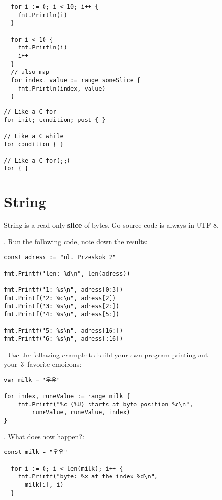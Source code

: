 \documentclass[11pt, letterpaper]{article}
\begin{document}
\begin{verbatim}
  for i := 0; i < 10; i++ {
    fmt.Println(i)
  }

  for i < 10 {
    fmt.Println(i)
    i++
  }
  // also map
  for index, value := range someSlice {
    fmt.Println(index, value)
  }
\end{verbatim}

\begin{verbatim}
// Like a C for
for init; condition; post { }

// Like a C while
for condition { }

// Like a C for(;;)
for { }
\end{verbatim}

\section{String}

String is a read-only \textbf{slice} of bytes. Go source code is always in {\small UTF}-8.

. Run the following code, note down the results:

\begin{verbatim}
const adress := "ul. Przeskok 2"

fmt.Printf("len: %d\n", len(adress))

fmt.Printf("1: %s\n", adress[0:3])
fmt.Printf("2: %c\n", adress[2])
fmt.Printf("3: %s\n", adress[2:])
fmt.Printf("4: %s\n", adress[5:])

fmt.Printf("5: %s\n", adress[16:])
fmt.Printf("6: %s\n", adress[:16])
\end{verbatim}


. Use the following example to build your own program printing out your~3~favorite emoicons:

\begin{verbatim}
var milk = "우유"

for index, runeValue := range milk {
	fmt.Printf("%c (%U) starts at byte position %d\n",
		runeValue, runeValue, index)
}
\end{verbatim}

. What does now happen?:

\begin{verbatim}
const milk = "우유"

  for i := 0; i < len(milk); i++ {
    fmt.Printf("byte: %x at the index %d\n",
      milk[i], i)
  }
\end{verbatim}
\end{document}
